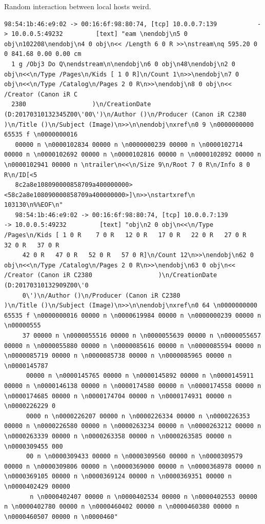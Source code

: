 \documentclass[11pt]{diazessay} %
\begin{document}
Random interaction between local hosts weird. 
\begin{lstlisting}
98:54:1b:46:e9:02 -> 00:16:6f:98:80:74, [tcp] 10.0.0.7:139           -> 10.0.0.5:49232         [text] "eam \nendobj\n5 0 obj\n102208\nendobj\n4 0 obj\n<< /Length 6 0 R >>\nstream\nq 595.20 0 0 841.68 0.00 0.00 cm
  1 g /Obj3 Do Q\nendstream\n\nendobj\n6 0 obj\n48\nendobj\n2 0 obj\n<<\n/Type /Pages\n/Kids [ 1 0 R]\n/Count 1\n>>\nendobj\n7 0 obj\n<<\n/Type /Catalog\n/Pages 2 0 R\n>>\nendobj\n8 0 obj\n<< /Creator (Canon iR C
  2380                  )\n/CreationDate (D:20170310132345Z00\'00\')\n/Author ()\n/Producer (Canon iR C2380                  )\n/Title ()\n/Subject (Image)\n>>\n\nendobj\nxref\n0 9 \n0000000000 65535 f \n0000000016
   00000 n \n0000102834 00000 n \n0000000239 00000 n \n0000102714 00000 n \n0000102692 00000 n \n0000102816 00000 n \n0000102892 00000 n \n0000102941 00000 n \ntrailer\n<<\n/Size 9\n/Root 7 0 R\n/Info 8 0 R\n/ID[<5
   8c2a8e108090000858709a400000000><58c2a8e108090000858709a400000000>]\n>>\nstartxref\n    103130\n%%EOF\n"
   98:54:1b:46:e9:02 -> 00:16:6f:98:80:74, [tcp] 10.0.0.7:139           -> 10.0.0.5:49232         [text] "obj\n2 0 obj\n<<\n/Type /Pages\n/Kids [ 1 0 R    7 0 R   12 0 R   17 0 R   22 0 R   27 0 R   32 0 R   37 0 R
     42 0 R   47 0 R   52 0 R   57 0 R]\n/Count 12\n>>\nendobj\n62 0 obj\n<<\n/Type /Catalog\n/Pages 2 0 R\n>>\nendobj\n63 0 obj\n<< /Creator (Canon iR C2380                  )\n/CreationDate (D:20170310132909Z00\'0
	 0\')\n/Author ()\n/Producer (Canon iR C2380                  )\n/Title ()\n/Subject (Image)\n>>\n\nendobj\nxref\n0 64 \n0000000000 65535 f \n0000000016 00000 n \n0000619984 00000 n \n0000000239 00000 n \n00000555
	 37 00000 n \n0000055516 00000 n \n0000055639 00000 n \n0000055657 00000 n \n0000055880 00000 n \n0000085616 00000 n \n0000085594 00000 n \n0000085719 00000 n \n0000085738 00000 n \n0000085965 00000 n \n0000145787
	  00000 n \n0000145765 00000 n \n0000145892 00000 n \n0000145911 00000 n \n0000146138 00000 n \n0000174580 00000 n \n0000174558 00000 n \n0000174685 00000 n \n0000174704 00000 n \n0000174931 00000 n \n0000226229 0
	  0000 n \n0000226207 00000 n \n0000226334 00000 n \n0000226353 00000 n \n0000226580 00000 n \n0000263234 00000 n \n0000263212 00000 n \n0000263339 00000 n \n0000263358 00000 n \n0000263585 00000 n \n0000309455 000
	  00 n \n0000309433 00000 n \n0000309560 00000 n \n0000309579 00000 n \n0000309806 00000 n \n0000369000 00000 n \n0000368978 00000 n \n0000369105 00000 n \n0000369124 00000 n \n0000369351 00000 n \n0000402429 00000
	   n \n0000402407 00000 n \n0000402534 00000 n \n0000402553 00000 n \n0000402780 00000 n \n0000460402 00000 n \n0000460380 00000 n \n0000460507 00000 n \n0000460"

\end{lstlisting}
\end{document}
